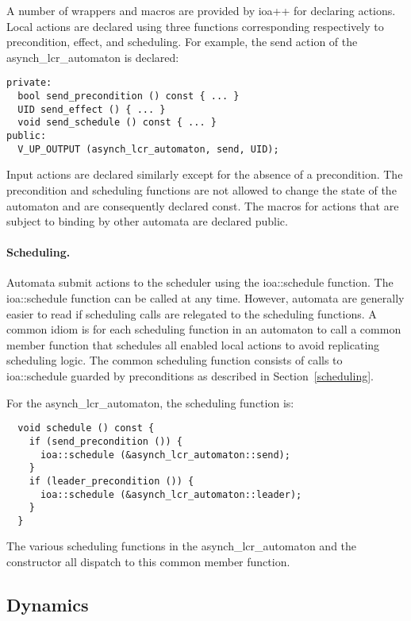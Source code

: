 A number of wrappers and macros are provided by ioa++ for declaring actions.
Local actions are declared using three functions corresponding respectively to precondition, effect, and scheduling.
\ifjournal
For example, the send action of the asynch\_lcr\_automaton is declared:
\begin{lstlisting}
private:
  bool send_precondition () const { ... }
  UID send_effect () { ... }
  void send_schedule () const { ... }
public:
  V_UP_OUTPUT (asynch_lcr_automaton, send, UID);
\end{lstlisting}
\fi
Input actions are declared similarly except for the absence of a precondition.
The precondition and scheduling functions are not allowed to change the state of the automaton and are consequently declared const.
The macros for actions that are subject to binding by other automata are declared public.

\paragraph*{Scheduling.}
Automata submit actions to the scheduler using the ioa::schedule function.
The ioa::schedule function can be called at any time.
However, automata are generally easier to read if scheduling calls are relegated to the scheduling functions.
A common idiom is for each scheduling function in an automaton to call a common member function that schedules all enabled local actions to avoid replicating scheduling logic.
The common scheduling function consists of calls to ioa::schedule guarded by preconditions as described in Section~\ref{scheduling}.

\ifjournal
For the asynch\_lcr\_automaton, the scheduling function is:
\begin{lstlisting}
  void schedule () const {
    if (send_precondition ()) {
      ioa::schedule (&asynch_lcr_automaton::send);
    }
    if (leader_precondition ()) {
      ioa::schedule (&asynch_lcr_automaton::leader);
    }
  }
\end{lstlisting}
The various scheduling functions in the asynch\_lcr\_automaton and the constructor all dispatch to this common member function.
\fi

\subsection{Dynamics\label{dynamic_composition}}

